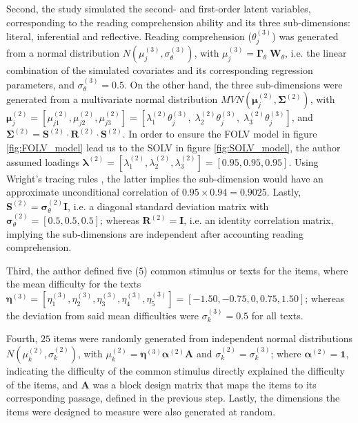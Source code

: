 Second, the study simulated the second- and first-order latent variables, corresponding to the reading comprehension ability and its three sub-dimensions: literal, inferential and reflective. Reading comprehension ($\theta^{(3)}_{j}$) was generated from a normal distribution $N( \mu^{(3)}_{j}, \sigma^{(3)}_{\theta} )$, with $\mu^{(3)}_{j} = \pmb{\Gamma}_{\theta} \; \mathbf{W}_{\theta}$, i.e. the linear combination of the simulated covariates and its corresponding regression parameters, and $\sigma^{(3)}_{\theta}=0.5$. On the other hand, the three sub-dimensions were generated from a multivariate normal distribution $MVN( \pmb{\mu}^{(2)}_{j} , \pmb{\Sigma}^{(2)})$, with $\pmb{\mu}^{(2)}_{j} = [\mu^{(2)}_{j1}, \mu^{(2)}_{j2}, \mu^{(2)}_{j3}] = [\lambda^{(2)}_{1} \theta^{(3)}_{j}, \; \lambda^{(2)}_{2} \theta^{(3)}_{j}, \; \lambda^{(2)}_{3} \theta^{(3)}_{j} ]$, and $\pmb{\Sigma}^{(2)} = \mathbf{S}^{(2)} \cdot \mathbf{R}^{(2)} \cdot \mathbf{S}^{(2)}$. In order to ensure the FOLV model in figure \ref{fig:FOLV_model} lead us to the SOLV in figure \ref{fig:SOLV_model}, the author assumed loadings $\pmb{\lambda}^{(2)} = [\lambda^{(2)}_{1}, \lambda^{(2)}_{2}, \lambda^{(2)}_{3}] = [0.95, 0.95, 0.95]$. Using Wright's tracing rules \cite{Beaujean_2014}, the latter implies the sub-dimension would have an approximate unconditional correlation of $0.95 \times 0.94 = 0.9025$. Lastly, $\mathbf{S}^{(2)} = \pmb{\sigma}^{(2)}_{\theta} \mathbf{I}$, i.e. a diagonal standard deviation matrix with $\pmb{\sigma}^{(2)}_{\theta} = [0.5, 0.5, 0.5]$; whereas $\mathbf{R}^{(2)} = \mathbf{I}$, i.e. an identity correlation matrix, implying the sub-dimensions are independent after accounting reading comprehension.

Third, the author defined five ($5$) common stimulus or texts for the items, where the mean difficulty for the texts $\pmb{\eta}^{(3)} = [\eta^{(3)}_{1}, \eta^{(3)}_{2}, \eta^{(3)}_{3}, \eta^{(3)}_{4}, \eta^{(3)}_{5}] = [-1.50, -0.75, 0, 0.75, 1.50]$; whereas the deviation from said mean difficulties were $\sigma^{(3)}_{k} = 0.5$ for all texts. 

Fourth, $25$ items were randomly generated from independent normal distributions $N( \mu^{(2)}_{k}, \sigma^{(2)}_{k} ) $, with $\mu^{(2)}_{k} = \pmb{\eta}^{(3)} \pmb{\alpha}^{(2)} \mathbf{A}$ and $\sigma^{(2)}_{k} = \sigma^{(3)}_{k}$; where $\pmb{\alpha}^{(2)} = \mathbf{1}$, indicating the difficulty of the common stimulus directly explained the difficulty of the items, and $\mathbf{A}$ was a block design matrix that maps the items to its corresponding passage, defined in the previous step. Lastly, the dimensions the items were designed to measure were also generated at random.

